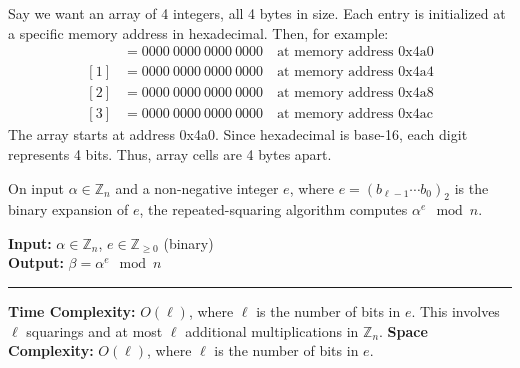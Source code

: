 \begin{Def}

    Say we want an array of 4 integers, all 4 bytes in size. Each entry is initialized at a specific memory address in hexadecimal. Then, for example:
    \begin{align*}
        [0] &= 0000 \ 0000 \ 0000 \ 0000 \quad \text{at memory address 0x4a0}\\
        [1] &= 0000 \ 0000 \ 0000 \ 0000 \quad \text{at memory address 0x4a4}\\
        [2] &= 0000 \ 0000 \ 0000 \ 0000 \quad \text{at memory address 0x4a8}\\
        [3] &= 0000 \ 0000 \ 0000 \ 0000 \quad \text{at memory address 0x4ac}
    \end{align*}
    \noindent
    The array starts at address 0x4a0. Since hexadecimal is base-16, each digit represents 4 bits. Thus, array cells are 4 bytes apart.
\end{Def}

    
\newpage

\begin{Func}
    On input \( \alpha \in \mathbb{Z}_n \) and a non-negative integer \( e \), where \( e = (b_{\ell-1} \cdots b_0)_2 \) is the binary expansion of \( e \), the repeated-squaring algorithm computes \( \alpha^e \mod n \).

    \vspace{.5em}
    \noindent
    \textbf{Input:} \( \alpha \in \mathbb{Z}_n \), \( e \in \mathbb{Z}_{\geq 0} \) (binary)\\
    \textbf{Output:} \( \beta = \alpha^e \mod n \)\\
    
    \begin{algorithm}[H]
        \SetAlgoLined
    \end{algorithm}

    \noindent\rule{\textwidth}{0.4pt}

    \noindent
    \textbf{Time Complexity:} \( O(\ell) \), where \( \ell \) is the number of bits in \( e \). This involves \( \ell \) squarings and at most \( \ell \) additional multiplications in \( \mathbb{Z}_n \).
    \textbf{Space Complexity:} \( O(\ell) \), where \( \ell \) is the number of bits in \( e \).
\end{Func}


